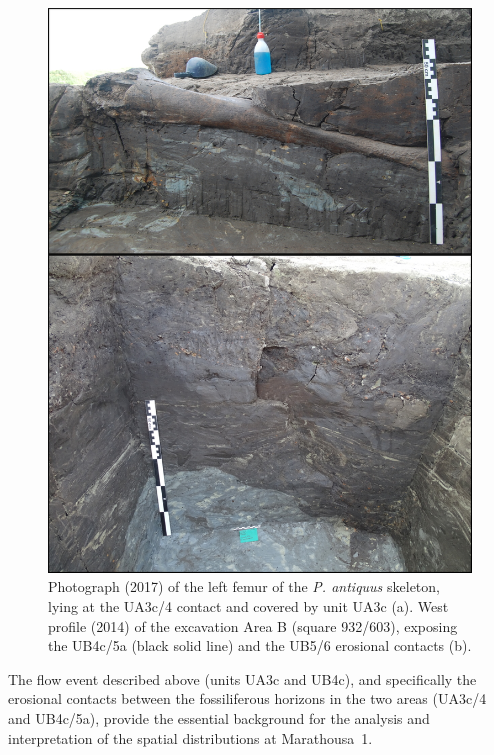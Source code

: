 \documentclass[preprint,authoryear,times]{elsarticle} %
\begin{document}
\begin{figure}[]
  \centering
  \includegraphics[width=1\textwidth]{../artwork/Fig4.png}
  \caption{Photograph (2017) of the left femur of the \emph{P. antiquus} skeleton, lying at the UA3c/4 contact and covered by unit UA3c (a). West profile (2014) of the excavation Area B (square 932/603), exposing the UB4c/5a (black solid line) and the UB5/6 erosional contacts (b).}
  \label{fig:4}
\end{figure}

The flow event described above (units UA3c and UB4c), and specifically the erosional contacts between the fossiliferous horizons in the two areas (UA3c/4 and UB4c/5a), provide the essential background for the analysis and interpretation of the spatial distributions at Marathousa~1.
\end{document}
